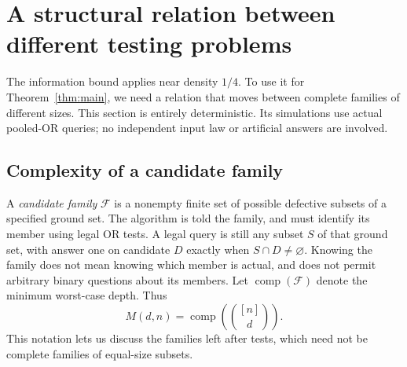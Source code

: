 \documentclass[11pt]{article}
\theoremstyle{definition}
\theoremstyle{remark}
\newcommand{\Comp}{\operatorname{comp}}
\numberwithin{equation}{section}
\begin{document}
\section{A structural relation between different testing problems}
\label{sec:structural}

The information bound applies near density \(1/4\). To use it for
Theorem~\ref{thm:main}, we need a relation that moves between complete
families of different sizes. This section is entirely deterministic.
Its simulations use actual pooled-OR queries; no independent input law
or artificial answers are involved.

\subsection{Complexity of a candidate family}

A \emph{candidate family} \(\mathcal F\) is a nonempty finite set of
possible defective subsets of a specified ground set. The algorithm
is told the family, and must identify its member using legal OR tests.
A legal query is still any subset \(S\) of that ground set, with
answer one on candidate \(D\) exactly when \(S\cap D\ne\varnothing\).
Knowing the family does not mean knowing which member is actual,
and does not permit arbitrary binary questions about its members.
Let \(\Comp(\mathcal F)\) denote the minimum worst-case depth.
Thus
\[
 M(d,n)=\Comp\left(\binom{[n]}d\right).
\]
This notation lets us discuss the families left after tests, which
need not be complete families of equal-size subsets.
\end{document}

